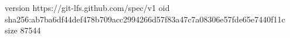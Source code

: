version https://git-lfs.github.com/spec/v1
oid sha256:ab7ba6df44def478b709acc2994266d57f83a47c7a08306e57fde65e7440f11c
size 87544

